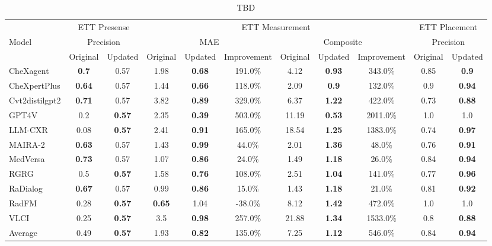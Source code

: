 \begin{table*}[htbp]
\centering
\small
\caption{TBD}
\begin{tabular}{lcccccccccc}
\toprule
& \multicolumn{2}{c}{ETT Presense} & \multicolumn{6}{c}{ETT Measurement} & \multicolumn{2}{c}{ETT Placement} \\
\cmidrule(lr){2-3} \cmidrule(lr){4-9} \cmidrule(lr){10-11}
Model & \multicolumn{2}{c}{Precision} & \multicolumn{3}{c}{MAE} & \multicolumn{3}{c}{Composite} & \multicolumn{2}{c}{Precision} \\
\cmidrule(lr){2-3} \cmidrule(lr){4-6} \cmidrule(lr){7-9} \cmidrule(lr){10-11}
 & Original & Updated & Original & Updated & Improvement & Original & Updated & Improvement & Original & Updated \\
\midrule
CheXagent & \textbf{0.7} & 0.57 & 1.98 & \textbf{0.68} & 191.0\% & 4.12 & \textbf{0.93} & 343.0\% & 0.85 & \textbf{0.9} \\
CheXpertPlus & \textbf{0.64} & 0.57 & 1.44 & \textbf{0.66} & 118.0\% & 2.09 & \textbf{0.9} & 132.0\% & 0.9 & \textbf{0.94} \\
Cvt2distilgpt2 & \textbf{0.71} & 0.57 & 3.82 & \textbf{0.89} & 329.0\% & 6.37 & \textbf{1.22} & 422.0\% & 0.73 & \textbf{0.88} \\
GPT4V & 0.2 & \textbf{0.57} & 2.35 & \textbf{0.39} & 503.0\% & 11.19 & \textbf{0.53} & 2011.0\% & 1.0 & 1.0 \\
LLM-CXR & 0.08 & \textbf{0.57} & 2.41 & \textbf{0.91} & 165.0\% & 18.54 & \textbf{1.25} & 1383.0\% & 0.74 & \textbf{0.97} \\
MAIRA-2 & \textbf{0.63} & 0.57 & 1.43 & \textbf{0.99} & 44.0\% & 2.01 & \textbf{1.36} & 48.0\% & 0.76 & \textbf{0.91} \\
MedVersa & \textbf{0.73} & 0.57 & 1.07 & \textbf{0.86} & 24.0\% & 1.49 & \textbf{1.18} & 26.0\% & 0.84 & \textbf{0.94} \\
RGRG & 0.5 & \textbf{0.57} & 1.58 & \textbf{0.76} & 108.0\% & 2.51 & \textbf{1.04} & 141.0\% & 0.77 & \textbf{0.96} \\
RaDialog & \textbf{0.67} & 0.57 & 0.99 & \textbf{0.86} & 15.0\% & 1.43 & \textbf{1.18} & 21.0\% & 0.81 & \textbf{0.92} \\
RadFM & 0.28 & \textbf{0.57} & \textbf{0.65} & 1.04 & -38.0\% & 8.12 & \textbf{1.42} & 472.0\% & 1.0 & 1.0 \\
VLCI & 0.25 & \textbf{0.57} & 3.5 & \textbf{0.98} & 257.0\% & 21.88 & \textbf{1.34} & 1533.0\% & 0.8 & \textbf{0.88} \\
\midrule
Average & 0.49 & \textbf{0.57} & 1.93 & \textbf{0.82} & 135.0\% & 7.25 & \textbf{1.12} & 546.0\% & 0.84 & \textbf{0.94} \\
\bottomrule
\end{tabular}
\label{tab:ett_run_all_mimic}
\end{table*}